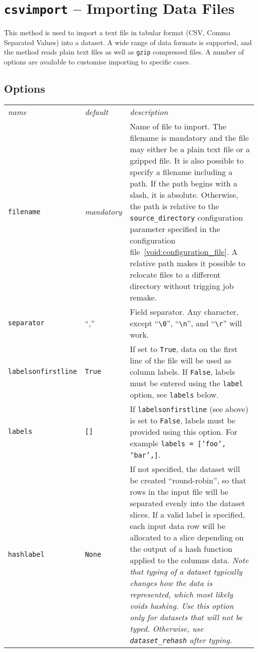 \section{\texttt{csvimport} -- Importing Data Files}

This method is used to import a text file in tabular format (CSV,
Comma Separated Values) into a dataset.  A wide range of data formats
is supported, and the method reads plain text files as well as
\texttt{gzip} compressed files.  A number of options are available to
customise importing to specific cases.


\subsection{Options}

\begin{tabular}{ p{3.2cm} p{1.8cm} p{10cm}}
  \textsl{name} & \textsl{default} & \textsl{description}\\[2ex]

  \texttt{filename} & \emph{mandatory} & Name of file to import.  The
  filename is mandatory and the file may either be a plain text file
  or a gzipped file.  It is also possible to specify a filename
  including a path.  If the path begins with a slash, it is absolute.
  Otherwise, the path is relative to the \texttt{source\_directory}
  configuration parameter specified in the configuration
  file~\ref{void:configuration_file}.  A relative path makes it
  possible to relocate files to a different directory without trigging
  job remake.\\[1ex]
  
  \texttt{separator} & ``,'' & Field separator.  Any character, except
  ``\verb$\0$'', ``\verb$\n$'', and ``\verb$\r$'' will work.\\[1ex]

  
  \texttt{labelsonfirstline} & \texttt{True} & If set to
  \texttt{True}, data on the first line of the file will be used as
  column labels.  If \texttt{False}, labels must be entered using the
  \texttt{label} option, see \texttt{labels} below.\\[1ex]

  \texttt{labels} & \texttt{[]} & If \texttt{labelsonfirstline} (see
  above) is set to \texttt{False}, labels must be provided using this
  option.  For example \texttt{labels = ['foo', 'bar',]}.\\[1ex]

  \texttt{hashlabel} & \texttt{None} & If not specified, the dataset
  will be created ``round-robin'', so that rows in the input file will
  be separated evenly into the dataset slices.  If a valid label is
  specified, each input data row will be allocated to a slice
  depending on the output of a hash function applied to the columns
  data.  \textsl{Note that typing of a dataset typically changes how
    the data is represented, which most likely voids hashing.  Use
    this option only for datasets that will not be typed.  Otherwise,
    use \texttt{dataset\_rehash} after typing.}\\[1ex]


\end{tabular}
